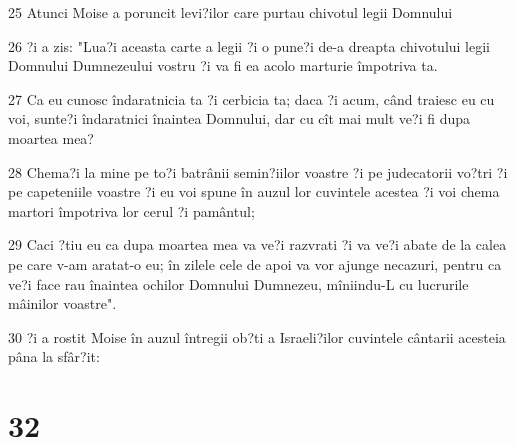 \par 25 Atunci Moise a poruncit levi?ilor care purtau chivotul legii Domnului
\par 26 ?i a zis: "Lua?i aceasta carte a legii ?i o pune?i de-a dreapta chivotului legii Domnului Dumnezeului vostru ?i va fi ea acolo marturie împotriva ta.
\par 27 Ca eu cunosc îndaratnicia ta ?i cerbicia ta; daca ?i acum, când traiesc eu cu voi, sunte?i îndaratnici înaintea Domnului, dar cu cît mai mult ve?i fi dupa moartea mea?
\par 28 Chema?i la mine pe to?i batrânii semin?iilor voastre ?i pe judecatorii vo?tri ?i pe capeteniile voastre ?i eu voi spune în auzul lor cuvintele acestea ?i voi chema martori împotriva lor cerul ?i pamântul;
\par 29 Caci ?tiu eu ca dupa moartea mea va ve?i razvrati ?i va ve?i abate de la calea pe care v-am aratat-o eu; în zilele cele de apoi va vor ajunge necazuri, pentru ca ve?i face rau înaintea ochilor Domnului Dumnezeu, mîniindu-L cu lucrurile mâinilor voastre".
\par 30 ?i a rostit Moise în auzul întregii ob?ti a Israeli?ilor cuvintele cântarii acesteia pâna la sfâr?it:

\chapter{32}

